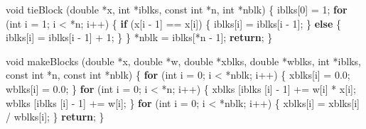 \documentclass[
  12pt,
]{book}
\newenvironment{Shaded}{\begin{snugshade}}{\end{snugshade}}
\newcommand{\ControlFlowTok}[1]{\textcolor[rgb]{0.13,0.29,0.53}{\textbf{#1}}}
\newcommand{\DataTypeTok}[1]{\textcolor[rgb]{0.13,0.29,0.53}{#1}}
\newcommand{\DecValTok}[1]{\textcolor[rgb]{0.00,0.00,0.81}{#1}}
\newcommand{\FloatTok}[1]{\textcolor[rgb]{0.00,0.00,0.81}{#1}}
\newcommand{\NormalTok}[1]{#1}
\theoremstyle{definition}
\theoremstyle{definition}
\theoremstyle{definition}
\theoremstyle{definition}
\theoremstyle{remark}
\begin{document}
\begin{Shaded}
\begin{Highlighting}[]
\DataTypeTok{void}\NormalTok{ tieBlock (}\DataTypeTok{double}\NormalTok{ *x, }\DataTypeTok{int}\NormalTok{ *iblks, }\DataTypeTok{const} \DataTypeTok{int}\NormalTok{ *n, }\DataTypeTok{int}\NormalTok{ *nblk) \{}
\NormalTok{    iblks[}\DecValTok{0}\NormalTok{] = }\DecValTok{1}\NormalTok{;}
    \ControlFlowTok{for}\NormalTok{ (}\DataTypeTok{int}\NormalTok{ i = }\DecValTok{1}\NormalTok{; i \textless{} *n; i++) \{}
        \ControlFlowTok{if}\NormalTok{ (x[i {-} }\DecValTok{1}\NormalTok{] == x[i]) \{}
\NormalTok{            iblks[i] = iblks[i {-} }\DecValTok{1}\NormalTok{];}
\NormalTok{        \} }\ControlFlowTok{else}\NormalTok{ \{}
\NormalTok{            iblks[i] = iblks[i {-} }\DecValTok{1}\NormalTok{] + }\DecValTok{1}\NormalTok{;}
\NormalTok{        \}}
\NormalTok{    \}}
\NormalTok{    *nblk = iblks[*n {-} }\DecValTok{1}\NormalTok{];}
    \ControlFlowTok{return}\NormalTok{;}
\NormalTok{\}}

\DataTypeTok{void}\NormalTok{ makeBlocks (}\DataTypeTok{double}\NormalTok{ *x, }\DataTypeTok{double}\NormalTok{ *w, }\DataTypeTok{double}\NormalTok{ *xblks, }\DataTypeTok{double}\NormalTok{ *wblks, }\DataTypeTok{int}\NormalTok{ *iblks, }\DataTypeTok{const} \DataTypeTok{int}\NormalTok{ *n, }\DataTypeTok{const} \DataTypeTok{int}\NormalTok{ *nblk) \{}
    \ControlFlowTok{for}\NormalTok{ (}\DataTypeTok{int}\NormalTok{ i = }\DecValTok{0}\NormalTok{; i \textless{} *nblk; i++) \{}
\NormalTok{        xblks[i] = }\FloatTok{0.0}\NormalTok{;}
\NormalTok{        wblks[i] = }\FloatTok{0.0}\NormalTok{;}
\NormalTok{    \}}
    \ControlFlowTok{for}\NormalTok{ (}\DataTypeTok{int}\NormalTok{ i = }\DecValTok{0}\NormalTok{; i \textless{} *n; i++) \{}
\NormalTok{        xblks [iblks [i] {-} }\DecValTok{1}\NormalTok{] += w[i] * x[i];}
\NormalTok{        wblks [iblks [i] {-} }\DecValTok{1}\NormalTok{] += w[i];}
\NormalTok{    \}}
    \ControlFlowTok{for}\NormalTok{ (}\DataTypeTok{int}\NormalTok{ i = }\DecValTok{0}\NormalTok{; i \textless{} *nblk; i++) \{}
\NormalTok{        xblks[i] = xblks[i] / wblks[i];}
\NormalTok{    \}}
    \ControlFlowTok{return}\NormalTok{;}
\NormalTok{\}}


\end{Highlighting}
\end{Shaded}
\end{document}
